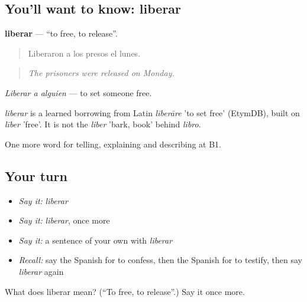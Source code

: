 \subsection*{You'll want to know: liberar}
\textbf{liberar} — \textquotedblleft{}to free, to release\textquotedblright{}.

\begin{quote}
Liberaron a los presos el lunes.
\end{quote}

\begin{quote}
\emph{The prisoners were released on Monday.}
\end{quote}

\emph{Liberar a alguien} — to set someone free.

\begin{cousinweb}
\emph{liberar} is a learned borrowing from Latin \emph{līberāre} 'to set free' (EtymDB), built on \emph{līber} 'free'. It is not the \emph{liber} 'bark, book' behind \emph{libro}.
\end{cousinweb}

\begin{grammarlens}[title={What you've built}]
One more word for telling, explaining and describing at B1.
\end{grammarlens}

\subsection*{Your turn}
\begin{itemize}
\raggedright
  \item \emph{Say it:} \emph{liberar}
  \item \emph{Say it:} \emph{liberar}, once more
  \item \emph{Say it:} a sentence of your own with \emph{liberar}
  \item \emph{Recall:} say the Spanish for to confess, then the Spanish for to testify, then say \emph{liberar} again
\end{itemize}

\begin{tcolorbox}[breakable,colback=teal!4,colframe=teal!35!black,title={Before you move on}]
What does liberar mean? (\textquotedblleft{}To free, to release\textquotedblright{}.) Say it once more.
\end{tcolorbox}
